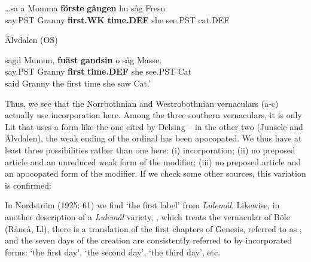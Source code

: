 

 \ea\label{}
\gll …sa  a  Momma  \textbf{förste}\textbf{  gången} hu  såg  Fresn\\


say.PST    Granny  \textbf{first.WK} \textbf{time.DEF} she  see.PST  cat.DEF\\

\item 

Älvdalen (OS)



 \ea\label{}
\gll sagd  Mumun,  \textbf{fuäst}\textbf{  gandsin} o  såg  Masse.\\


say.PST  Granny  \textbf{first} \textbf{time.DEF} she  see.PST  Cat\\

 said Granny the first time she saw Cat.’

\z

Thus, we see that the Norrbothnian and Westrobothnian vernaculars (a-c) actually use incorporation here. Among the three southern vernaculars, it is only Lit that uses a form like the one cited by Delsing – in the other two (Junsele and Älvdalen), the weak ending of the ordinal has been apocopated. We thus have at least three possibilities rather than one here: (i) incorporation; (ii) no preposed article and an unreduced weak form of the modifier; (iii) no preposed article and an apocopated form of the modifier. If we check some other sources, this variation is confirmed:


In Nordström (1925: 61) we find  ‘the first label’ from \textit{Lulemål}. Likewise, in another description of a \textit{Lulemål} variety, \citet{Wikberg2004}, which treats the vernacular of Böle (Råneå, Ll), there is a translation of the first chapters of Genesis, referred to as , and the seven days of the creation are consistently referred to by incorporated forms:  ‘the first day’,  ‘the second day’,  ‘the third day’, etc. 

